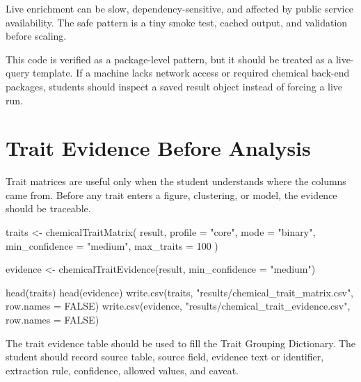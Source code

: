 Live enrichment can be slow, dependency-sensitive, and affected by public service availability. The safe pattern is a tiny smoke test, cached output, and validation before scaling.


This code is verified as a package-level pattern, but it should be treated as a live-query template. If a machine lacks network access or required chemical back-end packages, students should inspect a saved result object instead of forcing a live run.

\section{Trait Evidence Before Analysis}

Trait matrices are useful only when the student understands where the columns came from. Before any trait enters a figure, clustering, or model, the evidence should be traceable.

\begin{rcode}
traits <- chemicalTraitMatrix(
  result,
  profile = "core",
  mode = "binary",
  min_confidence = "medium",
  max_traits = 100
)

evidence <- chemicalTraitEvidence(result, min_confidence = "medium")

head(traits)
head(evidence)
write.csv(traits, "results/chemical_trait_matrix.csv", row.names = FALSE)
write.csv(evidence, "results/chemical_trait_evidence.csv", row.names = FALSE)
\end{rcode}

The trait evidence table should be used to fill the Trait Grouping Dictionary. The student should record source table, source field, evidence text or identifier, extraction rule, confidence, allowed values, and caveat.


